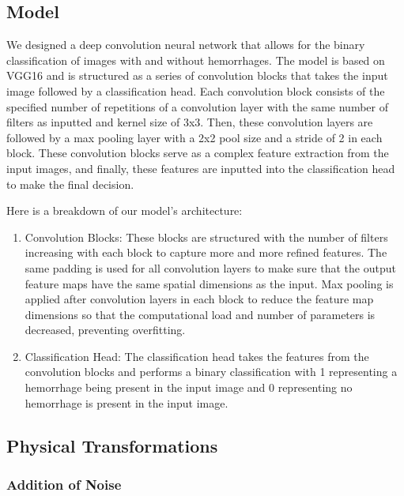 \documentclass{article}
\begin{document}
\subsection{Model}

\begin{par}
    We designed a deep convolution neural network that allows for the binary classification of images with and without hemorrhages. The model is based on VGG16 and is structured as a series of convolution blocks that takes the input image followed by a classification head. Each convolution block consists of the specified number of repetitions of a convolution layer with the same number of filters as inputted and kernel size of 3x3. Then, these convolution layers are followed by a max pooling layer with a 2x2 pool size and a stride of 2 in each block. These convolution blocks serve as a complex feature extraction from the input images, and finally, these features are inputted into the classification head to make the final decision.
    
    Here is a breakdown of our model's architecture:
    \begin{enumerate}
    \item Convolution Blocks: These blocks are structured with the number of filters increasing with each block to capture more and more refined features. The same padding is used for all convolution layers to make sure that the output feature maps have the same spatial dimensions as the input. Max pooling is applied after convolution layers in each block to reduce the feature map dimensions so that the computational load and number of parameters is decreased, preventing overfitting.

    \item Classification Head: The classification head takes the features from the convolution blocks and performs a binary classification with 1 representing a hemorrhage being present in the input image and 0 representing no hemorrhage is present in the input image.
    \end{enumerate}
\end{par}

\subsection{Physical Transformations}

\subsubsection{Addition of Noise}
\end{document}
